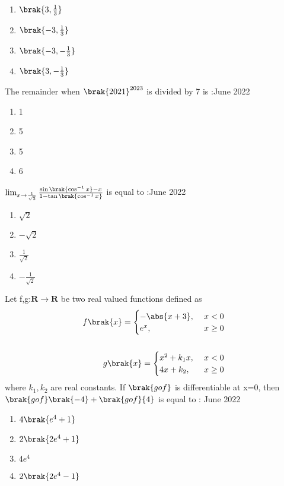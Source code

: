 \begin{enumerate}
    \item $\brak{3,\frac{1}{3}}$
    \item $\brak{-3,\frac{1}{3}}$
    \item $\brak{-3,-\frac{1}{3}}$
    \item $\brak{3,-\frac{1}{3}}$
\end{enumerate}
\bigskip
\item The remainder when $\brak{2021}^{2023}$ is divided by 7 is :\hfill{June 2022}
\begin{enumerate}
    \item 1
    \item 5
    \item 5
    \item 6
\end{enumerate}
\bigskip
\item $\lim_{x\to {\frac{1}{\sqrt{2}}}} \frac{\sin{\brak{\cos^{-1}{x}}}-x}{1-\tan{\brak{\cos^{-1}{x}}}}$ is equal to :\hfill{June 2022}
\begin{enumerate}
    \item $\sqrt{2}$
    \item $-\sqrt{2}$
    \item $\frac{1}{\sqrt{2}}$
    \item $-\frac{1}{\sqrt{2}}$
\end{enumerate}
\bigskip
\item Let f,g:$\mathbf{R}\rightarrow \mathbf{R}$ be two real valued functions defined as
\begin{align*}
    f\brak{x}=
    \begin{cases}
        -\abs{x+3} , \,\, &x<0\\
        e^x , &x\geq0
    \end{cases}\\ \\
    g\brak{x}=
    \begin{cases}
        x^2+k_1x ,\,\, &x<0\\
        4x+k_2, &x\geq0
    \end{cases}
\end{align*}
where $k_1,k_2$ are real constants. If $\brak{gof}$ is differentiable at x=0, then $\brak{gof}\brak{-4}+\brak{gof}{4}$ is equal to : \hfill{June 2022}
\begin{enumerate}
    \item $4\brak{e^4+1}$
    \item $2\brak{2e^4+1}$
    \item $4e^4$
    \item $2\brak{2e^4-1}$
\end{enumerate}
